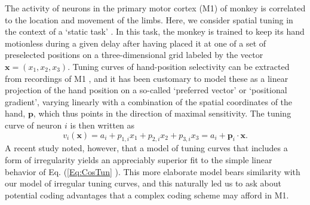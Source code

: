 \documentclass[a4paper]{article}%
\begin{document}
The activity of neurons in the primary motor cortex (M1) of monkey is
correlated to the location and movement of the limbs. Here, we consider
spatial tuning in the context of a `static task'
\cite[]{Kettner1988PrimateOrigins}. In this task, the monkey is trained to keep
its hand motionless during a given delay after having placed it at one of a
set of preselected positions on a three-dimensional grid labeled by the vector
$\mathbf{x}=\left(  x_{1},x_{2},x_{3}\right)  $. Tuning curves of
hand-position selectivity can be extracted from recordings of M1
\cite[]{Kettner1988PrimateOrigins,Wang2007MotorReaching}, and it has been
customary to model these as a linear projection of the hand position on a
so-called `preferred vector' or `positional gradient', varying linearly with a
combination of the spatial coordinates of the hand, $\mathbf{p}$, which thus
points in the direction of maximal sensitivity\cite[]{Wang2007MotorReaching}.
The tuning curve of neuron $i$ is then written as
\begin{equation}
v_{i}(\mathbf{x})=a_{i}+p_{1,i}x_{1}+p_{2,i}x_{2}+p_{3,i}x_{3}=a_{i}+\mathbf{p}_{i}\cdot\mathbf{x}. \label{Eq:CosTun}
\end{equation}
A recent study \cite[]{Lalazar2016TuningConnectivity} noted, however, that a
model of tuning curves that includes a form of irregularity yields an
appreciably superior fit to the simple linear behavior of Eq. (\ref{Eq:CosTun}
). This more elaborate model \cite[]{Lalazar2016TuningConnectivity} bears
similarity with our model of irregular tuning curves, and this naturally led
us to ask about potential coding advantages that a complex coding scheme may
afford in M1.
\end{document}
